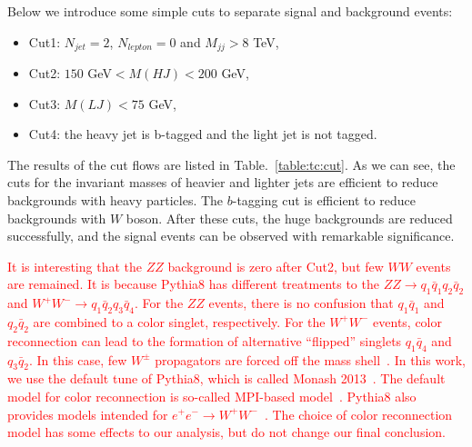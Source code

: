 \documentclass[a4paper,11pt]{article}
\begin{document}
Below we introduce some simple cuts to separate signal and background events:
\begin{itemize}
  \item Cut1: $N_{jet}=2$, $N_{lepton}=0$ and $M_{jj}>8$ TeV,
  \item Cut2: $150$ GeV$<M(HJ)<200$ GeV,
  \item Cut3: $M(LJ)<75$ GeV,
  \item Cut4: the heavy jet is b-tagged and the light jet is not tagged.
\end{itemize}
The results of the cut flows are listed in Table.~\ref{table:tc:cut}. 
As we can see, the cuts for the invariant masses of heavier and lighter jets are efficient to reduce backgrounds with heavy particles.
The $b$-tagging cut is efficient to reduce backgrounds with $W$ boson. 
After these cuts, the huge backgrounds are reduced successfully, 
and the signal events can be observed with remarkable significance. 

\textcolor{red}{
It is interesting that the $ZZ$ background is zero after Cut2, 
but few $WW$ events are remained.
It is because Pythia8 has different treatments to the $ZZ\to q_1\bar{q}_1q_2\bar{q}_2$ and $W^+W^-\to q_1\bar{q}_2q_3\bar{q}_4$. 
For the $ZZ$ events, there is no confusion that $q_1\bar{q}_1$ and $q_2\bar{q}_2$ are combined to a color singlet, respectively. 
For the $W^+W^-$ events, color reconnection can lead to the formation of alternative ``flipped'' singlets $q_1\bar{q}_4$ and $q_3\bar{q}_2$. 
In this case, few $W^\pm$ propagators are forced off the mass shell~\cite{Sjostrand:1993hi}. 
In this work, we use the default tune of Pythia8, which is called Monash 2013~\cite{Skands:2014pea}. 
The default model for color reconnection is so-called MPI-based model~\cite{Sjostrand:1987su}. 
Pythia8 also provides models intended for $e^+e^-\to W^+W^-$~\cite{Sjostrand:1993hi,Sjostrand:1993rb}. 
The choice of color reconnection model has some effects to our analysis, 
but do not change our final conclusion. 
}
\end{document}
